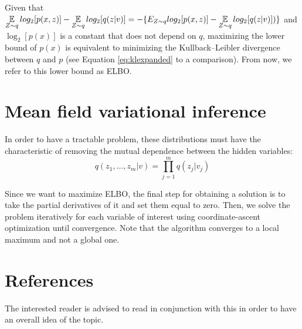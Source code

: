 Given that $ \displaystyle \operatorname*{\mathbb{E}}_{Z \sim q} log_2[p(x,z)] - \operatorname*{\mathbb{E}}_{Z \sim q} log_2[q(z | v)] = -\{E_{Z \sim q} log_2[p(x,z)] - \operatorname*{\mathbb{E}}_{Z \sim q} log_2[q(z | v)])\}$
and $\log_2[p(x)]$ is a constant that does not depend on $q$,
maximizing the lower bound of $p(x)$ is equivalent to minimizing the Kullback–Leibler divergence between $q$ and $p$ (see Equation \ref{eq:klexpanded} to a comparison).
From now, we refer to this lower bound as ELBO.

\section{Mean field variational inference}
In order to have a tractable problem, these distributions must have the characteristic
of removing the mutual dependence between the hidden variables:
$$ q(z_1, ..., z_m| v) = \prod_{j=1}^m q(z_j | v_j) $$

Since we want to maximize ELBO,
the final step for obtaining a solution is to take the partial derivatives of it and set them equal to zero.
Then, we solve the problem iteratively for each variable of interest using coordinate-ascent optimization until convergence.
Note that the algorithm converges to a local maximum and not a global one.

\section{References}
The interested reader is advised to read \cite{Blei_2017} in conjunction with this in order to have an overall idea of the topic.